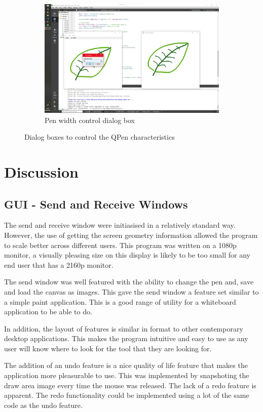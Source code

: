 \documentclass[10pt]{article}
\newcommand{\figsquish}{\vspace{-5mm}} %
\begin{document}
\begin{multicols*}{2}
\begin{figure}[H]
\begin{subfigure}[t]{0.48\columnwidth}
		\includegraphics[width=\columnwidth]{./width.png}
		\caption{Pen width control dialog box}
		\label{fig:width}
	\end{subfigure}
	\caption{Dialog boxes to control the QPen characteristics}
	\label{fig:drawDialogs}
\end{figure}
\figsquish


\section{Discussion}
\subsection{GUI - Send and Receive Windows}
The send and receive window were initiasised in a relatively standard way. However, the use of getting the screen geometry information allowed the program to scale better across different users. This program was written on a 1080p monitor, a visually pleasing size on this display is likely to be too small for any end user that has a 2160p monitor.

The send window was well featured with the ability to change the pen and, save and load the canvas as images. This gave the send window a feature set similar to a simple paint application. This is a good range of utility for a whiteboard application to be able to do.

In addition, the layout of features is similar in format to other contemporary desktop applications. This makes the program intuitive and easy to use as any user will know where to look for the tool that they are looking for.

The addition of an undo feature is a nice quality of life feature that makes the application more pleasurable to use. This was implemented by snapshoting the draw area image every time the mouse was released. The lack of a redo feature is apparent. The redo functionality could be implemented using a lot of the same code as the undo feature.


\end{multicols*}
\end{document}
